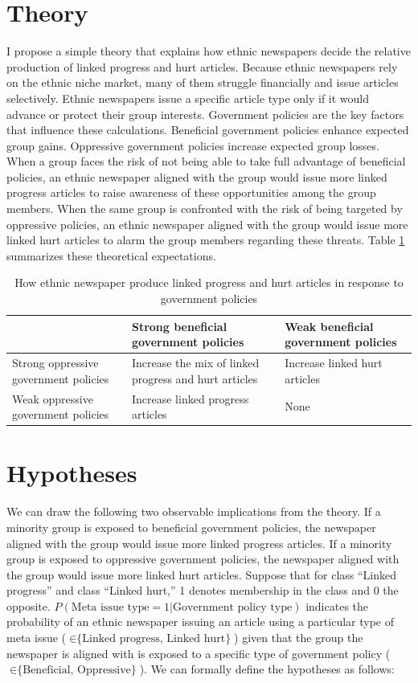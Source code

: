 \documentclass[12 pt]{article}
\begin{document}
\section{Theory}
I propose a simple theory that explains how ethnic newspapers decide the relative production of linked progress and hurt articles. Because ethnic newspapers rely on the ethnic niche market, many of them struggle financially and issue articles selectively. Ethnic newspapers issue a specific article type only if it would advance or protect their group interests. Government policies are the key factors that influence these calculations. Beneficial government policies enhance expected group gains. Oppressive government policies increase expected group losses. When a group faces the risk of not being able to take full advantage of beneficial policies, an ethnic newspaper aligned with the group would issue more linked progress articles to raise awareness of these opportunities among the group members. When the same group is confronted with the risk of being targeted by oppressive policies, an ethnic newspaper aligned with the group would issue more linked hurt articles to alarm the group members regarding these threats. Table \ref{tab:expectations} summarizes these theoretical expectations.

\begin{table}[htbp!]
	\centering
	\caption{How ethnic newspaper produce linked progress and hurt articles in response to government policies}
	\label{tab:expectations}
	\begin{tabularx}{\textwidth}{ X | X | X}
		\toprule
		 & Strong beneficial government policies & Weak beneficial government policies \\ \midrule
		Strong oppressive government policies & Increase the mix of linked progress and hurt articles & Increase linked hurt articles \\ \hline
		Weak oppressive government policies & Increase linked progress articles & None \\ \hline 
		\bottomrule
	\end{tabularx}
\end{table}

\section{Hypotheses}

We can draw the following two observable implications from the theory. If a minority group is exposed to beneficial government policies, the newspaper aligned with the group would issue more linked progress articles. If a minority group is exposed to oppressive government policies, the newspaper aligned with the group would issue more linked hurt articles. Suppose that for class “Linked progress” and class “Linked hurt,” 1 denotes membership in the class and 0 the opposite. $P(\textrm{Meta issue type} = 1|\textrm{Government policy type})$ indicates the probability of an ethnic newspaper issuing an article using a particular type of meta issue ($\in \textrm{\{Linked progress, Linked hurt\}}$) given that the group the newspaper is aligned with is exposed to a specific type of government policy ($\in \textrm{\{Beneficial, Oppressive\}}$). We can formally define the hypotheses as follows:
\end{document}
